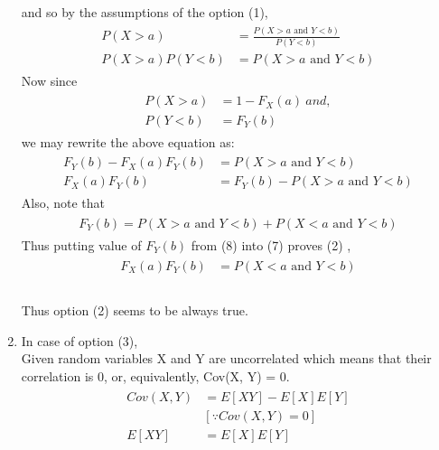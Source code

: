 \documentclass[journal,12pt,twocolumn]{IEEEtran}
\begin{document}
\begin{enumerate}
\begin{align}
\begin{split}
    \end{split}
\end{align}
and so by the assumptions of the option (1),
\begin{align}\tag{5}
    \begin{split}
        P(X > a) &= \frac{P(X > a \mbox{ and } Y < b)}{P(Y < b)}\\
        P(X > a)P(Y < b) &= P(X > a \mbox{ and } Y < b)
    \end{split}
\end{align}
Now since 
\begin{align}\tag{6}
    \begin{split}
        P(X > a) &= 1 - F_X(a)\ and,\\
        P(Y < b) &= F_Y(b)
    \end{split}
\end{align}
we may rewrite the above equation as:
\begin{align}\tag{7}
    \begin{split}
        F_Y(b) - F_X(a)F_Y(b) &= P(X > a \mbox{ and } Y < b)\\
        F_X(a)F_Y(b) &= F_Y(b) - P(X > a \mbox{ and } Y < b)
    \end{split}
\end{align}
Also, note that 
\begin{align}\tag{8}
    \begin{split}
        F_Y(b) = P(X > a \mbox{ and } Y < b) + P(X < a \mbox{ and } Y < b)
    \end{split}
\end{align}
Thus putting value of $F_Y(b)$ from (8) into (7) proves (2) ,
\begin{align}\tag{9}
    \begin{split}
        F_X(a)F_Y(b) &= P(X < a \mbox{ and } Y < b)\\
    \end{split}
\end{align}\\
Thus option (2) seems to be always true.\\
    \item In case of option (3),\\
Given random variables X and Y are uncorrelated which means that their correlation is 0, or, equivalently, Cov(X, Y) = 0.\\
\begin{align}\tag{10}
    \begin{split}
        Cov(X, Y) &= E[XY] - E[X]E[Y]\\
        &[\because Cov(X, Y) = 0]\\
        E[XY] &= E[X]E[Y]
    \end{split}
\end{align}


\end{enumerate}
\end{document}
